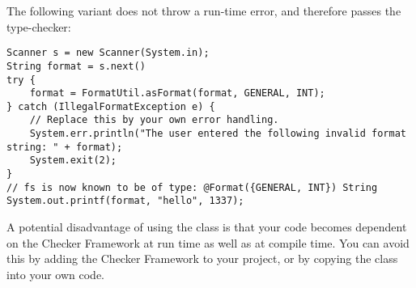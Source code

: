\noindent The following variant does not throw a run-time error, and
therefore passes the type-checker:

\begin{Verbatim}
Scanner s = new Scanner(System.in);
String format = s.next()
try {
    format = FormatUtil.asFormat(format, GENERAL, INT);
} catch (IllegalFormatException e) {
    // Replace this by your own error handling.
    System.err.println("The user entered the following invalid format string: " + format);
    System.exit(2);
}
// fs is now known to be of type: @Format({GENERAL, INT}) String
System.out.printf(format, "hello", 1337);
\end{Verbatim}

\noindent A potential disadvantage of using the  class is that your code becomes
dependent on the Checker Framework at run time as well as at compile time. You
can avoid this by adding the Checker Framework to your project, or by copying
the  class into your own code.

